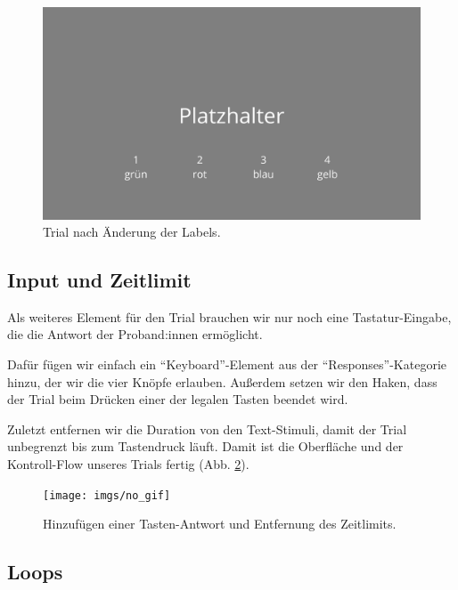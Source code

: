 \documentclass[
]{book}
\begin{document}
\begin{figure}

{\centering \includegraphics[width=.8\textwidth]{imgs/step3} 

}

\caption{Trial nach Änderung der Labels.}\label{fig:step3}
\end{figure}

\hypertarget{input-und-zeitlimit}{%
\subsection{Input und Zeitlimit}\label{input-und-zeitlimit}}

Als weiteres Element für den Trial brauchen wir nur noch eine Tastatur-Eingabe, die die Antwort der Proband:innen ermöglicht.

Dafür fügen wir einfach ein ``Keyboard''-Element aus der ``Responses''-Kategorie hinzu, der wir die vier Knöpfe erlauben. Außerdem setzen wir den Haken, dass der Trial beim Drücken einer der legalen Tasten beendet wird.

Zuletzt entfernen wir die Duration von den Text-Stimuli, damit der Trial unbegrenzt bis zum Tastendruck läuft. Damit ist die Oberfläche und der Kontroll-Flow unseres Trials fertig (Abb. \ref{fig:step4}).



\begin{figure}

{\centering \texttt{[image: imgs/no\_gif]} 

}

\caption{Hinzufügen einer Tasten-Antwort und Entfernung des Zeitlimits.}\label{fig:step4}
\end{figure}

\hypertarget{loops}{%
\subsection{Loops}\label{loops}}
\end{document}
